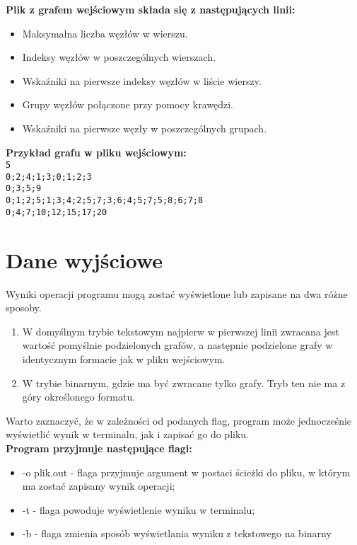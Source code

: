\documentclass{article}
\begin{document}
\textbf{Plik z grafem wejściowym składa się z następujących linii:}

\begin{itemize}
  \item Maksymalna liczba węzłów w wierszu.
  \item Indeksy węzłów w poszczególnych wierszach.
  \item Wskaźniki na pierwsze indeksy węzłów w liście wierszy.
  \item Grupy węzłów połączone przy pomocy krawędzi.
  \item Wskaźniki na pierwsze węzły w poszczególnych grupach.
\end{itemize}
\textbf{Przykład grafu w pliku wejściowym:}\\
\texttt{5\\0;2;4;1;3;0;1;2;3\\0;3;5;9\\0;1;2;5;1;3;4;2;5;7;3;6;4;5;7;5;8;6;7;8 \\0;4;7;10;12;15;17;20}

\section*{Dane wyjściowe}
Wyniki operacji programu mogą zostać wyświetlone lub zapisane na dwa różne sposoby.
\begin{enumerate}
\item W domyślnym trybie tekstowym najpierw w pierwszej linii zwracana jest wartość pomyślnie podzielonych grafów, a następnie podzielone grafy w identycznym formacie jak w pliku wejściowym.

\item W trybie binarnym, gdzie ma być zwracane tylko grafy. Tryb ten nie ma z góry określonego formatu.
\end{enumerate}

Warto zaznaczyć, że w zależności od podanych flag, program może jednocześnie wyświetlić wynik w terminalu, jak i zapisać go do pliku.\\

\textbf{Program przyjmuje następujące flagi:}
\begin{itemize}
\item -o plik.out - flaga przyjmuje argument w postaci ścieżki do pliku, w którym ma zostać zapisany wynik operacji;

\item -t - flaga powoduje wyświetlenie wyniku w terminalu;

\item -b - flaga zmienia sposób wyświetlania wyniku z tekstowego na binarny
\end{itemize}
\end{document}
